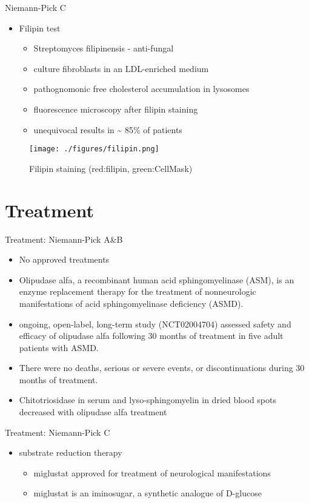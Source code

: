 \documentclass[presentation, smaller]{beamer}
\begin{document}
\begin{frame}[label={sec:orgheadline20}]{Niemann-Pick C}
\begin{itemize}
\item Filipin test
\begin{itemize}
\item Streptomyces filipinensis - anti-fungal
\item culture fibroblasts in an LDL-enriched medium
\item pathognomonic free cholesterol accumulation in lysosomes
\item fluorescence microscopy after filipin staining
\item unequivocal results in \textasciitilde{} 85\% of patients
\end{itemize}
\end{itemize}

\begin{figure}[htb]
\centering
\texttt{[image: ./figures/filipin.png]}
\caption{\label{fig:}
Filipin staining (red:filipin, green:CellMask)}
\end{figure}
\end{frame}

\section{Treatment}
\label{sec:orgheadline25}
\begin{frame}[label={sec:orgheadline22}]{Treatment: Niemann-Pick A\&B}
\begin{itemize}
\item No approved treatments
\item Olipudase alfa, a recombinant human acid sphingomyelinase (ASM), is
an enzyme replacement therapy for the treatment of nonneurologic
manifestations of acid sphingomyelinase deficiency (ASMD).
\item ongoing, open-label, long-term study (NCT02004704) assessed safety
and efficacy of olipudase alfa following 30 months of treatment in
five adult patients with ASMD.
\item There were no deaths, serious or severe events, or discontinuations
during 30 months of treatment.
\item Chitotriosidase in serum and lyso-sphingomyelin in dried blood spots
decreased with olipudase alfa treatment
\end{itemize}
\end{frame}

\begin{frame}[label={sec:orgheadline23}]{Treatment: Niemann-Pick C}
\begin{itemize}
\item substrate reduction therapy
\begin{itemize}
\item miglustat approved for treatment of neurological manifestations
\item miglustat is an iminosugar, a synthetic analogue of D-glucose
\end{itemize}
\end{itemize}
\end{frame}
\end{document}
